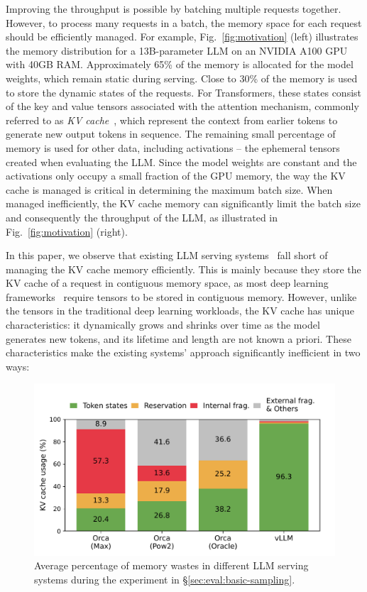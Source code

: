 Improving the throughput is possible by batching multiple requests together.
However, to process many requests in a batch, the memory space for each request should be efficiently managed.
For example, Fig.~\ref{fig:motivation} (left) illustrates the memory distribution for a 13B-parameter LLM on an NVIDIA A100 GPU with 40GB RAM.
Approximately 65\% of the memory is allocated for the model weights, which remain static during serving.
Close to 30\% of the memory is used to store the dynamic states of the requests.
For Transformers, these states consist of the key and value tensors associated with the attention mechanism, commonly referred to as \emph{KV cache}~\cite{pope2022efficiently}, which represent the context from earlier tokens to generate new output tokens in sequence.
The remaining small percentage of memory is used for other data, including activations – the ephemeral tensors created when evaluating the LLM.
Since the model weights are constant and the activations only occupy a small fraction of the GPU memory, the way the KV cache is managed is critical in determining the maximum batch size.
When managed inefficiently, the KV cache memory can significantly limit the batch size and consequently the throughput of the LLM, as illustrated in Fig.~\ref{fig:motivation} (right).

In this paper, we observe that existing LLM serving systems~\cite{yu2022orca,nvidiaft} fall short of managing the KV cache memory efficiently.
This is mainly because they store the KV cache of a request in contiguous memory space, as most deep learning frameworks~\cite{paszke2019pytorch, olston2017tensorflow} require tensors to be stored in contiguous memory.
However, unlike the tensors in the traditional deep learning workloads, the KV cache has unique characteristics: it dynamically grows and shrinks over time as the model generates new tokens, and its lifetime and length are not known a priori.
These characteristics make the existing systems' approach significantly inefficient in two ways:

\begin{figure}[t]
    \centering
    \includegraphics[width=\columnwidth]{figures/experiments/memory_breakdown.pdf}
    \caption{Average percentage of memory wastes in different LLM serving systems during the experiment in \S\ref{sec:eval:basic-sampling}.}
    \label{fig:memory-waste-percentage}
\end{figure}

